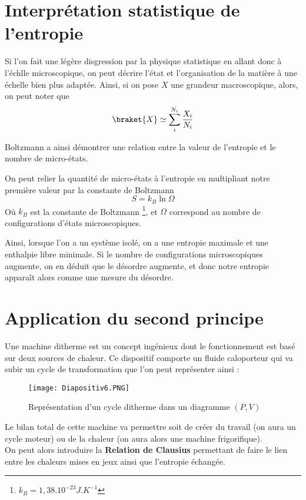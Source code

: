 \section{Interprétation statistique de l'entropie}

Si l'on fait une légère disgression par la physique statistique en allant donc à l'échlle microscopique, on peut décrire l'état et l'organisation de la matière à une échelle bien plus adaptée. Ainsi, si on pose $X$ une grandeur macroscopique, alors, on peut noter que 
$$\braket{X}\simeq \sum \limits_i^{N_i} \frac{X_i}{N_i}$$

Boltzmann a ainsi démontrer une relation entre la valeur de l'entropie et le nombre de micro-états.
\begin{theorem} 
On peut relier la quantité de micro-états à l'entropie en multipliant notre première valeur par la constante de Boltzmann
$$S = k_B \ln \Omega$$
Où $k_B$ est la constante de Boltzmann \footnote{$k_B=1,38.10^{-23}J.K^{-1}$}, et $\Omega$ correspond au nombre de configurations d'états microscopiques.\
\end{theorem}

Ainsi, lorsque l'on a un système isolé, on a une entropie maximale et une enthalpie libre minimale. Si le nombre de configurations microscopiques augmente, on en déduit que le désordre augmente, et donc notre entropie apparaît alors comme une mesure du désordre.

\section{Application du second principe}

Une machine ditherme est un concept ingénieux dont le fonctionnement est basé sur deux sources de chaleur. Ce dispositif comporte un fluide caloporteur qui va subir un cycle de transformation que l'on peut représenter ainsi :

\begin{figure}[H]
\centering
\texttt{[image: Diapositiv6.PNG]}
\caption{Représentation d'un cycle ditherme dans un diagramme $(P,V)$}
\end{figure}

Le bilan total de cette machine va permettre soit de créer du travail (on aura un cycle moteur) ou de la chaleur (on aura alors une machine frigorifique).\\

On peut alors introduire la \textbf{Relation de Clausius} permettant de faire le lien entre les chaleurs mises en jeux ainsi que l'entropie échangée.\\

